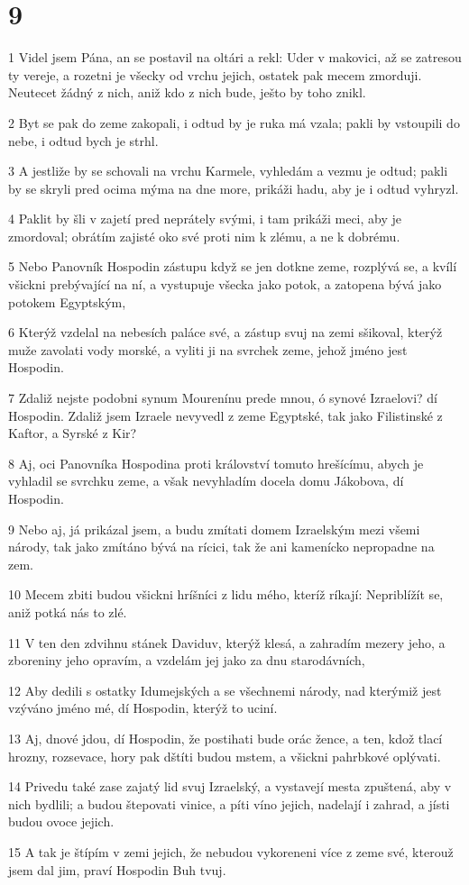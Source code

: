 \chapter{9}

\par 1 Videl jsem Pána, an se postavil na oltári a rekl: Uder v makovici, až se zatresou ty vereje, a rozetni je všecky od vrchu jejich, ostatek pak mecem zmorduji. Neutecet žádný z nich, aniž kdo z nich bude, ješto by toho znikl.
\par 2 Byt se pak do zeme zakopali, i odtud by je ruka má vzala; pakli by vstoupili do nebe, i odtud bych je strhl.
\par 3 A jestliže by se schovali na vrchu Karmele, vyhledám a vezmu je odtud; pakli by se skryli pred ocima mýma na dne more, prikáži hadu, aby je i odtud vyhryzl.
\par 4 Paklit by šli v zajetí pred neprátely svými, i tam prikáži meci, aby je zmordoval; obrátím zajisté oko své proti nim k zlému, a ne k dobrému.
\par 5 Nebo Panovník Hospodin zástupu když se jen dotkne zeme, rozplývá se, a kvílí všickni prebývající na ní, a vystupuje všecka jako potok, a zatopena bývá jako potokem Egyptským,
\par 6 Kterýž vzdelal na nebesích paláce své, a zástup svuj na zemi sšikoval, kterýž muže zavolati vody morské, a vyliti ji na svrchek zeme, jehož jméno jest Hospodin.
\par 7 Zdaliž nejste podobni synum Mourenínu prede mnou, ó synové Izraelovi? dí Hospodin. Zdaliž jsem Izraele nevyvedl z zeme Egyptské, tak jako Filistinské z Kaftor, a Syrské z Kir?
\par 8 Aj, oci Panovníka Hospodina proti království tomuto hrešícímu, abych je vyhladil se svrchku zeme, a však nevyhladím docela domu Jákobova, dí Hospodin.
\par 9 Nebo aj, já prikázal jsem, a budu zmítati domem Izraelským mezi všemi národy, tak jako zmítáno bývá na rícici, tak že ani kamenícko nepropadne na zem.
\par 10 Mecem zbiti budou všickni hríšníci z lidu mého, kteríž ríkají: Nepriblížít se, aniž potká nás to zlé.
\par 11 V ten den zdvihnu stánek Daviduv, kterýž klesá, a zahradím mezery jeho, a zboreniny jeho opravím, a vzdelám jej jako za dnu starodávních,
\par 12 Aby dedili s ostatky Idumejských a se všechnemi národy, nad kterýmiž jest vzýváno jméno mé, dí Hospodin, kterýž to uciní.
\par 13 Aj, dnové jdou, dí Hospodin, že postihati bude orác žence, a ten, kdož tlací hrozny, rozsevace, hory pak dštíti budou mstem, a všickni pahrbkové oplývati.
\par 14 Privedu také zase zajatý lid svuj Izraelský, a vystavejí mesta zpuštená, aby v nich bydlili; a budou štepovati vinice, a píti víno jejich, nadelají i zahrad, a jísti budou ovoce jejich.
\par 15 A tak je štípím v zemi jejich, že nebudou vykoreneni více z zeme své, kterouž jsem dal jim, praví Hospodin Buh tvuj.


